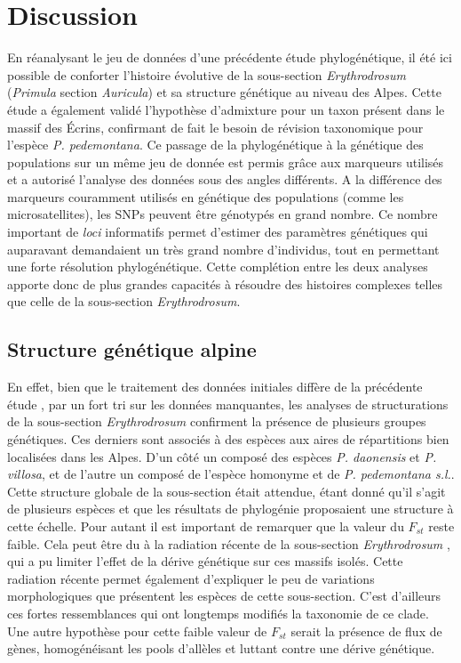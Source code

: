 \documentclass[../Master_report2.tex]{subfiles}
\begin{document}
\section{Discussion}

En réanalysant le jeu de données d'une précédente étude phylogénétique, il été ici possible de conforter l'histoire évolutive de la sous-section \textit{Erythrodrosum} (\textit{Primula} section \textit{Auricula}) et sa structure génétique au niveau des Alpes. Cette étude a également validé l'hypothèse d'admixture pour un taxon présent dans le massif des Écrins, confirmant de fait  le besoin de révision taxonomique pour l'espèce \textit{P. pedemontana}. Ce passage de la phylogénétique à la génétique des populations sur un même jeu de donnée est permis grâce aux marqueurs utilisés et a autorisé l'analyse des données sous des angles différents. A la différence des marqueurs couramment utilisés en génétique des populations (comme les microsatellites), les SNPs peuvent être génotypés en grand nombre. Ce nombre important de \textit{loci} informatifs permet d'estimer des paramètres génétiques qui auparavant demandaient un très grand nombre d'individus, tout en permettant une forte résolution phylogénétique. Cette complétion entre les deux analyses apporte donc de plus grandes capacités à résoudre des histoires complexes telles que celle de la sous-section \textit{Erythrodrosum}.

\subsection{Structure génétique alpine}

En effet, bien que le traitement des données initiales diffère de la précédente étude \citep{Boucher2016a}, par un fort tri sur les données manquantes, les analyses de structurations de la sous-section \textit{Erythrodrosum} confirment la présence de plusieurs groupes génétiques. Ces derniers sont associés à des espèces aux aires de répartitions bien localisées dans les Alpes. D'un côté un  composé des espèces \textit{P. daonensis} et \textit{P. villosa}, et de l'autre un  composé de l'espèce homonyme et de \textit{P. pedemontana s.l.}. Cette structure globale de la sous-section était attendue, étant donné qu'il s'agit de plusieurs espèces et que les résultats de phylogénie proposaient une structure à cette échelle. Pour autant il est important de remarquer que la valeur du $F_{st}$ reste faible. Cela peut être du à la radiation récente de la sous-section \textit{Erythrodrosum} \citep{Boucher2016}, qui a pu limiter l'effet de la dérive génétique sur ces massifs isolés. Cette radiation récente permet également d'expliquer le peu de variations morphologiques que présentent les espèces de cette sous-section. C'est d'ailleurs ces fortes ressemblances qui ont longtemps modifiés la taxonomie de ce clade. Une autre hypothèse pour cette faible valeur de $F_{st}$ serait la présence de flux de gènes, homogénéisant les pools d'allèles et luttant contre une dérive génétique.
 
\end{document}
